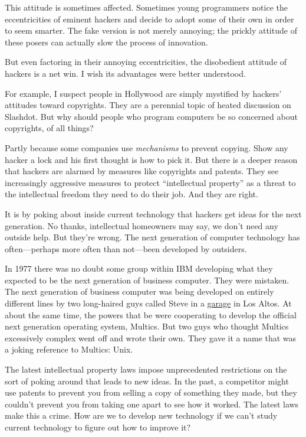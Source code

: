This attitude is sometimes affected. Sometimes young programmers notice
the eccentricities of eminent hackers and decide to adopt some of their
own in order to seem smarter. The fake version is not merely annoying;
the prickly attitude of these posers can actually slow the process of
innovation.

But even factoring in their annoying eccentricities, the disobedient
attitude of hackers is a net win. I wish its advantages were better
understood.

For example, I suspect people in Hollywood are simply mystified by
hackers' attitudes toward copyrights. They are a perennial topic of
heated discussion on Slashdot. But why should people who program
computers be so concerned about copyrights, of all things?

Partly because some companies use \emph{mechanisms} to prevent copying.
Show any hacker a lock and his first thought is how to pick it. But
there is a deeper reason that hackers are alarmed by measures like
copyrights and patents. They see increasingly aggressive measures to
protect ``intellectual property'' as a threat to the intellectual
freedom they need to do their job. And they are right.

It is by poking about inside current technology that hackers get ideas
for the next generation. No thanks, intellectual homeowners may say, we
don't need any outside help. But they're wrong. The next generation of
computer technology has often---perhaps more often than not---been
developed by outsiders.

In 1977 there was no doubt some group within IBM developing what they
expected to be the next generation of business computer. They were
mistaken. The next generation of business computer was being developed
on entirely different lines by two long-haired guys called Steve in a
\href{garage.html}{garage} in Los Altos. At about the same time, the
powers that be were cooperating to develop the official next generation
operating system, Multics. But two guys who thought Multics excessively
complex went off and wrote their own. They gave it a name that was a
joking reference to Multics: Unix.

The latest intellectual property laws impose unprecedented restrictions
on the sort of poking around that leads to new ideas. In the past, a
competitor might use patents to prevent you from selling a copy of
something they made, but they couldn't prevent you from taking one apart
to see how it worked. The latest laws make this a crime. How are we to
develop new technology if we can't study current technology to figure
out how to improve it?

